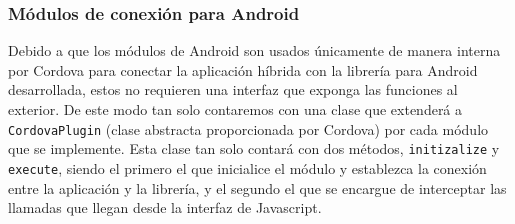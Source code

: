 \documentclass[a4paper, 12pt]{article}
\begin{document}
\subsubsection{Módulos de conexión para Android}
\label{sec-4-3-2}
Debido a que los módulos de Android son usados únicamente de manera interna por Cordova para conectar la aplicación híbrida con la librería para Android desarrollada, estos no requieren una interfaz que
exponga las funciones al exterior. De este modo tan solo contaremos con una clase que extenderá a \verb~CordovaPlugin~ (clase abstracta proporcionada por Cordova) por cada módulo que se implemente.
Esta clase tan solo contará con dos métodos, \verb~initizalize~ y  \verb~execute~, siendo el primero el que inicialice el módulo y establezca la conexión entre la aplicación y la librería, y el segundo el que
se encargue de interceptar las llamadas que llegan desde la interfaz de Javascript.
\end{document}
